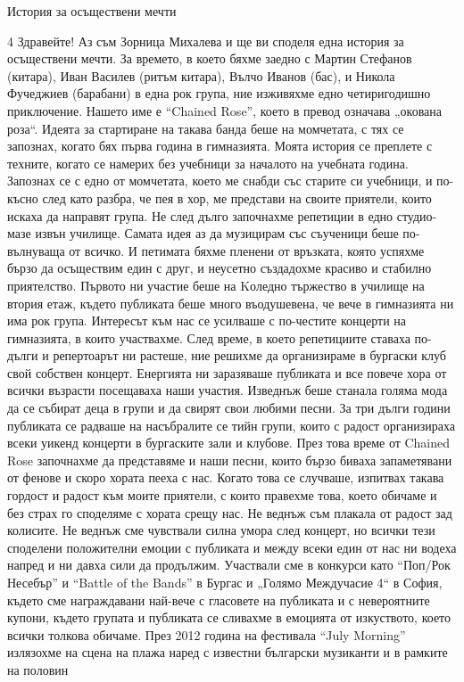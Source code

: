 \begin{multicols}{3}История за осъществени  мечти 

4 
Здравейте! Аз съм Зорница Михалева и ще ви споделя една история за осъществени мечти. За времето, в което бяхме заедно с Мартин Стефанов (китара), Иван Василев (ритъм китара), Вълчо Иванов (бас), и Никола Фучеджиев (барабани) в една рок група, ние изживяхме едно четиригодишно приключение. Нашето име е  “Chained Rose”, което в превод означава „окована роза“. Идеята за стартиране на такава банда беше на момчетата, с тях се запознах, когато бях първа година в гимназията. Моята история се преплете с техните, когато се 
намерих без учебници за началото на учебната година. Запознах се с едно от момчетата, което ме снабди със старите си учебници, и по-късно след като разбра, че пея в хор, ме представи на своите приятели, които искаха да направят група. Не след дълго започнахме репетиции в едно студио-мазе извън училище. Самата идея аз да музицирам със съученици беше по-вълнуваща от всичко. И петимата бяхме пленени от връзката, която успяхме бързо да осъществим един с друг, и неусетно 
създадохме красиво и стабилно приятелство. Първото ни участие беше на Kоледно тържество в училище на втория етаж, където публиката беше много въодушевена, че вече в гимназията ни има рок група. Интересът към нас се усилваше с по-честите концерти на гимназията, в които участвахме. След време, в което репетициите 
ставаха по-дълги и репертоарът ни растеше, ние решихме да организираме в бургаски клуб свой собствен концерт. Енергията ни заразяваше публиката и все повече хора от всички възрасти посещаваха наши участия. Изведнъж беше станала голяма мода да 
се събират деца в групи и да свирят свои любими песни. За три дълги години публиката се радваше на насъбралите се тийн групи, които с радост организираха всеки уикенд концерти в бургаските зали и клубове. През това време от Chained Rose започнахме да представяме и наши песни, които бързо биваха запаметявани от фенове и скоро хората пееха с нас. Когато това се случваше, изпитвах такава 
гордост и радост към моите приятели, с които правехме това, което обичаме и без страх го споделяме с хората срещу нас. Не веднъж съм плакала от радост зад колисите. Не веднъж сме чувствали силна умора след концерт, но всички тези споделени положителни емоции с публиката и между всеки един от нас ни водеха 
напред и ни давха сили да продължим. Участвали сме в конкурси като “Поп/Рок Несебър” и “Battle of the Bands” в Бургас и „Голямо Междучасие 4“ в София, където сме награждавани най-вече с гласовете на публиката и с невероятните купони, където групата и публиката се сливахме в емоцията от изкуството, което всички толкова обичаме. През 2012 година на фестивала “July Morning” излязохме на сцена на плажа наред с известни български музиканти и в рамките на половин 

\end{multicols}
